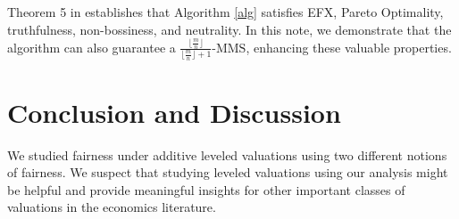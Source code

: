 \documentclass{article}
\theoremstyle{definition}
\begin{document}
\begin{remark}
    Theorem 5 in \cite{christodoulou2024fairtruthfulallocationsleveled} establishes that Algorithm \ref{alg} satisfies EFX, Pareto Optimality, truthfulness, non-bossiness, and neutrality. In this note, we demonstrate that the algorithm can also guarantee a $\frac{\lfloor\frac{m}{n}\rfloor}{\lfloor\frac{m}{n}\rfloor + 1}\text{-MMS}$, enhancing these valuable properties.
\end{remark}

\section{Conclusion and Discussion}

We studied fairness under additive leveled valuations using two different notions of fairness. We suspect that studying leveled valuations using our analysis might be helpful and provide meaningful insights for other important classes of valuations in the economics literature.



\end{document}
